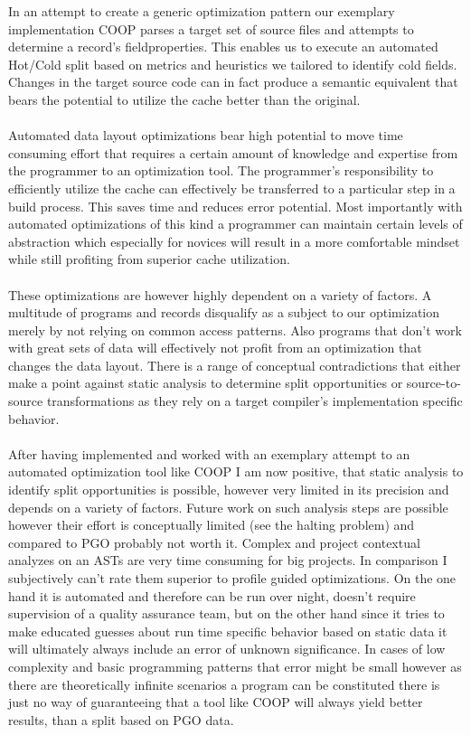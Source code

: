 In an attempt to create a generic optimization pattern our exemplary implementation COOP parses a target set of source files and attempts to determine a record's fieldproperties. This enables us to execute an automated Hot/Cold split based on metrics and heuristics we tailored to identify cold fields. Changes in the target source code can in fact produce a semantic equivalent that bears the potential to utilize the cache better than the original.\\\\
Automated data layout optimizations bear high potential to move time consuming effort that requires a certain amount of knowledge and expertise from the programmer to an optimization tool. The programmer's responsibility to efficiently utilize the cache can effectively be transferred to a particular step in a build process. This saves time and reduces error potential. Most importantly with automated optimizations of this kind a programmer can maintain certain levels of abstraction which especially for novices will result in a more comfortable mindset while still profiting from superior cache utilization.\\\\
These optimizations are however highly dependent on a variety of factors. A multitude of programs and records disqualify as a subject to our optimization merely by not relying on common access patterns. Also programs that don't work with great sets of data will effectively not profit from an optimization that changes the data layout. There is a range of conceptual contradictions that either make a point against static analysis to determine split opportunities or source-to-source transformations as they rely on a target compiler's implementation specific behavior.\\\\
After having implemented and worked with an exemplary attempt to an automated optimization tool like COOP I am now positive, that static analysis to identify split opportunities is possible, however very limited in its precision and depends on a variety of factors. Future work on such analysis steps are possible however their effort is conceptually limited (see the halting problem) and compared to PGO probably not worth it. Complex and project contextual analyzes on an ASTs are very time consuming for big projects. In comparison I subjectively can't rate them superior to profile guided optimizations. On the one hand it is automated and therefore can be run over night, doesn't require supervision of a quality assurance team, but on the other hand since it tries to make educated guesses about run time specific behavior based on static data it will ultimately always include an error of unknown significance. In cases of low complexity and basic programming patterns that error might be small however as there are theoretically infinite scenarios a program can be constituted there is just no way of guaranteeing that a tool like COOP will always yield better results, than a split based on PGO data.\\
